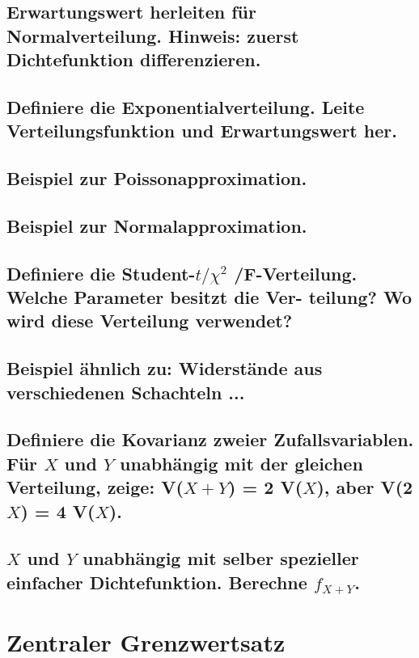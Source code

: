 \documentclass[a4paper,10pt]{article}
\begin{document}
\subsection{Erwartungswert herleiten für Normalverteilung. Hinweis: zuerst Dichtefunktion differenzieren.}

\subsection{Definiere die Exponentialverteilung. Leite Verteilungsfunktion und Erwartungswert her.}

\subsection{Beispiel zur Poissonapproximation.}

\subsection{Beispiel zur Normalapproximation.}

\subsection{Definiere die Student-$t /\chi^2$ /F-Verteilung. Welche Parameter besitzt die Ver-
teilung? Wo wird diese Verteilung verwendet?}

\subsection{Beispiel ähnlich zu: Widerstände aus verschiedenen Schachteln ...}

\subsection{Definiere die Kovarianz zweier Zufallsvariablen. Für $X$ und $Y$ unabhängig mit der gleichen Verteilung, zeige: V($X + Y$) = 2 V($X$), aber V(2$X$) = 4 V($X$).}

\subsection{$X$ und $Y$ unabhängig mit selber spezieller einfacher Dichtefunktion. Berechne $f_{X + Y}$.}

\newpage
\section{Zentraler Grenzwertsatz}
\end{document}

